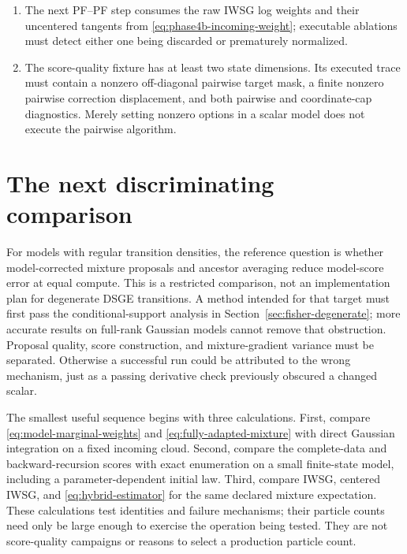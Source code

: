 \documentclass[11pt]{article}
\begin{document}
\begin{enumerate}[leftmargin=2em]
        evidence.
  \item The next PF--PF step consumes the raw IWSG log weights and their
        uncentered tangents from \eqref{eq:phase4b-incoming-weight}; executable
        ablations must detect either one being discarded or prematurely
        normalized.
  \item The score-quality fixture has at least two state dimensions.  Its
        executed trace must contain a nonzero off-diagonal pairwise target mask,
        a finite nonzero pairwise correction displacement, and both pairwise and
        coordinate-cap diagnostics.  Merely setting nonzero options in a scalar
        model does not execute the pairwise algorithm.
\end{enumerate}

\section{The next discriminating comparison}
\label{sec:next-study}

For models with regular transition densities, the reference question is
whether model-corrected mixture proposals and ancestor averaging reduce
model-score error at equal compute. This is a restricted comparison, not an
implementation plan for degenerate DSGE transitions. A method intended for
that target must first pass the conditional-support analysis in
Section~\ref{sec:fisher-degenerate}; more accurate results on full-rank
Gaussian models cannot remove that obstruction. Proposal
quality, score construction, and mixture-gradient variance must be separated.
Otherwise a successful run could be attributed to the wrong mechanism, just
as a passing derivative check previously obscured a changed scalar.

The smallest useful sequence begins with three calculations. First, compare
\eqref{eq:model-marginal-weights} and
\eqref{eq:fully-adapted-mixture} with direct Gaussian integration on a fixed
incoming cloud. Second, compare the complete-data and backward-recursion
scores with exact enumeration on a small finite-state model, including a
parameter-dependent initial law. Third, compare IWSG, centered IWSG, and
\eqref{eq:hybrid-estimator} for the same declared mixture expectation.
These calculations test identities and failure mechanisms; their particle
counts need only be large enough to exercise the operation being tested.
They are not score-quality campaigns or reasons to select a production
particle count.
\end{document}
